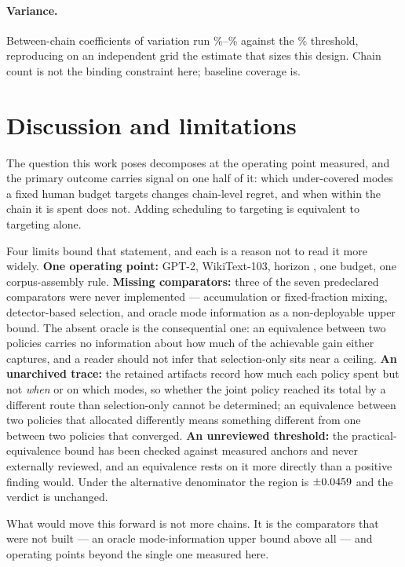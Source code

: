 \documentclass{article}
\begin{document}
\paragraph{Variance.}
Between-chain coefficients of variation run \PilotCVLow\%--\PilotCVHigh\% against the
\PilotThresholdPct\% threshold, reproducing on an independent grid the estimate that sizes
this design. Chain count is not the binding constraint here; baseline coverage is.

\section{Discussion and limitations}
\label{sec:discussion}

The question this work poses decomposes at the operating point measured, and the primary
outcome carries signal on one half of it: which under-covered modes a fixed human budget
targets changes chain-level regret, and when within the chain it is spent does not. Adding
scheduling to targeting is equivalent to targeting alone.

Four limits bound that statement, and each is a reason not to read it more widely.
\textbf{One operating point:} GPT-2, WikiText-103, horizon \PilotHorizon{}, one budget, one
corpus-assembly rule. \textbf{Missing comparators:} three of the seven predeclared
comparators were never implemented --- accumulation or fixed-fraction mixing, detector-based
selection, and oracle mode information as a non-deployable upper bound. The absent oracle is
the consequential one: an equivalence between two policies carries no information about how
much of the achievable gain either captures, and a reader should not infer that
selection-only sits near a ceiling. \textbf{An unarchived trace:} the retained artifacts
record how much each policy spent but not \emph{when} or on which modes, so whether the joint
policy reached its total by a different route than selection-only cannot be determined; an
equivalence between two policies that allocated differently means something different from
one between two policies that converged. \textbf{An unreviewed threshold:} the
practical-equivalence bound has been checked against measured anchors and never externally
reviewed, and an equivalence rests on it more directly than a positive finding would.
Under the alternative denominator the region is $\pm0.0459{}$ and the
verdict is unchanged.

What would move this forward is not more chains. It is the comparators that were not built
--- an oracle mode-information upper bound above all --- and operating points beyond the
single one measured here.







\end{document}
